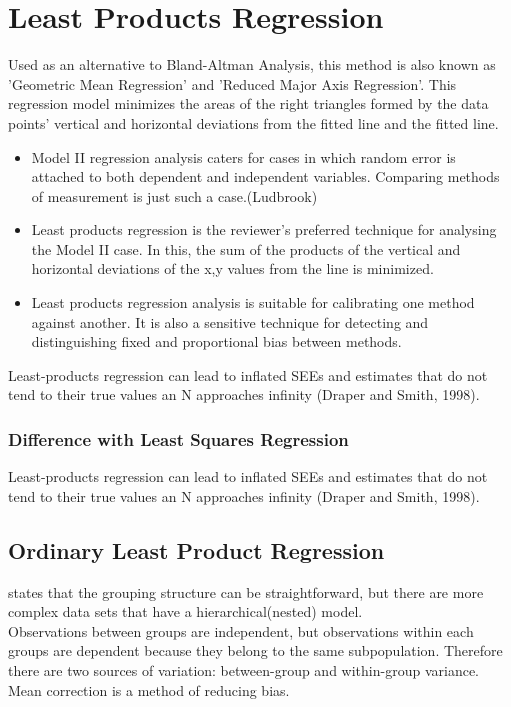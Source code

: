 \documentclass[12pt, a4paper]{report}
\theoremstyle{plain}
\theoremstyle{definition}
\theoremstyle{remark}
\begin{document}
\section{Least Products Regression}
Used as an alternative to Bland-Altman Analysis, this method is also known as 'Geometric Mean Regression' and 'Reduced Major Axis Regression'. This regression model minimizes the areas of the right triangles formed by the data points' vertical and horizontal deviations from the fitted line and the fitted line.

\begin{itemize}
	\item Model II regression analysis caters for cases in which random error is attached to both dependent and independent variables. Comparing methods of measurement is just such a case.(Ludbrook)
	
	\item Least products regression is the reviewer's preferred technique for analysing the Model II case. In this, the sum of the products of the vertical and horizontal deviations of the x,y values from the line is minimized.
	
	\item Least products regression analysis is suitable for calibrating one method against another. It is also a sensitive technique for detecting and distinguishing fixed and proportional bias between
	methods.
\end{itemize}

Least-products regression can lead to inflated SEEs and estimates that do not tend to their true values an N approaches infinity (Draper and Smith, 1998).

\subsubsection{Difference with Least Squares Regression}
Least-products regression can lead to inflated SEEs and estimates
that do not tend to their true values an N approaches infinity
(Draper and Smith, 1998).




\subsection{Ordinary Least Product Regression}
\citet{ludbrook97} states that the grouping structure can be
straightforward, but there are more complex data sets that have a
hierarchical(nested) model.
\\

Observations between groups are independent, but observations
within each groups are dependent because they belong to the same
subpopulation. Therefore there are two sources of variation:
between-group and within-group variance.
\vspace{5 mm} \noindent Mean correction is a method of reducing
bias.





\end{document}
